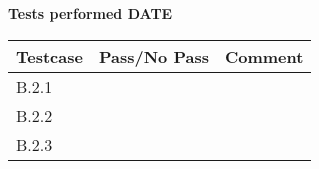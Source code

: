 \renewcommand{\testdate}{DATE}
\textbf{Tests performed \testdate}
\begin{center}
  		\begin{tabular}{| p{3cm} | p{5cm} | p{5cm} |}
    		\hline
	    	\textbf{Testcase}			& \textbf{Pass/No Pass} 	& \textbf{Comment} \\ \hline
    		B.2.1		 						&  										&  				\\ \hline
    		B.2.2		 						&  										& 				 \\	\hline
    		B.2.3		 						&  										& 				 \\	\hline
 		\end{tabular}
\end{center}